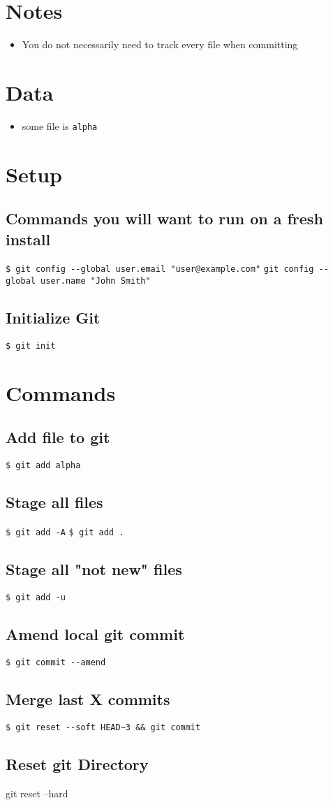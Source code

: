 \documentclass{article}
\title{\vspace{-2.25cm}{\small Git}\vspace{-1.5cm}}
\date{}
\begin{document}
\maketitle
\begin{multicols}{3}
\section{Notes}
\begin{itemize}
\item You do not necessarily need to track every file when committing
\end{itemize}
\section{Data}
\begin{itemize}
\item some file is \texttt{alpha}
\end{itemize}
\section{Setup}
\subsection{Commands you will want to run on a fresh install}
\lstinline|$ git config --global user.email "user@example.com"|
\lstinline|git config --global user.name "John Smith"|
\subsection{Initialize Git}
\lstinline|$ git init|
\section{Commands}
\subsection{Add file to git}
\lstinline|$ git add alpha|
\subsection{Stage all files}
\lstinline|$ git add -A|
\lstinline|$ git add .|
\subsection{Stage all "not new" files}
\lstinline|$ git add -u|
\subsection{Amend local git commit}
\lstinline|$ git commit --amend|
\subsection{Merge last X commits}
\lstinline|$ git reset --soft HEAD~3 && git commit|
\subsection{Reset git Directory}
git reset --hard
\end{multicols}
\end{document}
